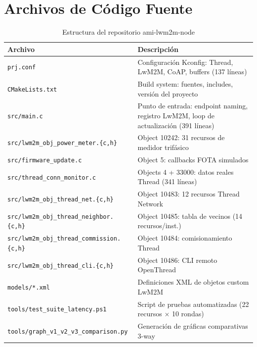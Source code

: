 \documentclass[11pt,a4paper]{article}
\begin{document}
\section{Archivos de Código Fuente}

\begin{table}[H]
\centering
\caption{Estructura del repositorio ami-lwm2m-node}
\label{tab:archivos}
\begin{tabularx}{\textwidth}{l X}
\toprule
\textbf{Archivo} & \textbf{Descripción} \\
\midrule
\texttt{prj.conf} & Configuración Kconfig: Thread, LwM2M, CoAP, buffers (137 líneas) \\
\texttt{CMakeLists.txt} & Build system: fuentes, includes, versión del proyecto \\
\texttt{src/main.c} & Punto de entrada: endpoint naming, registro LwM2M, loop de actualización (391 líneas) \\
\texttt{src/lwm2m\_obj\_power\_meter.\{c,h\}} & Object 10242: 31 recursos de medidor trifásico \\
\texttt{src/firmware\_update.c} & Object 5: callbacks FOTA simulados \\
\texttt{src/thread\_conn\_monitor.c} & Objects 4 + 33000: datos reales Thread (341 líneas) \\
\texttt{src/lwm2m\_obj\_thread\_net.\{c,h\}} & Object 10483: 12 recursos Thread Network \\
\texttt{src/lwm2m\_obj\_thread\_neighbor.\{c,h\}} & Object 10485: tabla de vecinos (14 recursos/inst.) \\
\texttt{src/lwm2m\_obj\_thread\_commission.\{c,h\}} & Object 10484: comisionamiento Thread \\
\texttt{src/lwm2m\_obj\_thread\_cli.\{c,h\}} & Object 10486: CLI remoto OpenThread \\
\texttt{models/*.xml} & Definiciones XML de objetos custom LwM2M \\
\texttt{tools/test\_suite\_latency.ps1} & Script de pruebas automatizadas (22 recursos $\times$ 10 rondas) \\
\texttt{tools/graph\_v1\_v2\_v3\_comparison.py} & Generación de gráficas comparativas 3-way \\
\bottomrule
\end{tabularx}
\end{table}

\end{document}
